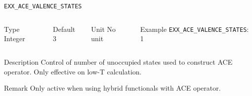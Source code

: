     \begin{frame}[allowframebreaks]{\texttt{EXX\_ACE\_VALENCE\_STATES}} \label{EXX_ACE_VALENCE_STATES}
    \vspace*{-12pt}
    \begin{columns}
    \begin{block}{Type}
    Integer
    \end{block}
    
    \begin{block}{Default}
    3
    \end{block}
    
    \begin{block}{Unit}
    No unit
    \end{block}
    
    \begin{block}{Example}
    \texttt{EXX\_ACE\_VALENCE\_STATES}: 1
    \end{block}
    \end{columns}
    
    \begin{block}{Description}
    Control of number of unoccupied states used to construct ACE operator. Only effective on low-T calculation.
    \end{block}
    
    \begin{block}{Remark}
    Only active when using hybrid functionals with ACE operator. 
    \end{block}
    
    \end{frame}
    
